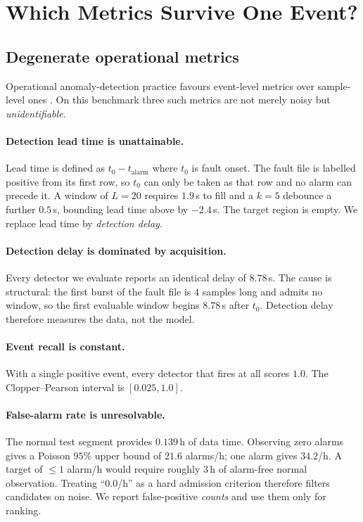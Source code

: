 \documentclass[twocolumn,10pt]{article}
\begin{document}
\section{Which Metrics Survive One Event?}
\label{sec:metrics}

\subsection{Degenerate operational metrics}

Operational anomaly-detection practice favours event-level metrics over
sample-level ones \citep{hundman2018detecting,garg2021evaluation}. On this
benchmark three such metrics are not merely noisy but \emph{unidentifiable}.

\paragraph{Detection lead time is unattainable.} Lead time is defined as
$t_0 - t_{\text{alarm}}$ where $t_0$ is fault onset. The fault file is labelled
positive from its first row, so $t_0$ can only be taken as that row and no
alarm can precede it. A window of $L=20$ requires $1.9$\,s to fill and a
$k=5$ debounce a further $0.5$\,s, bounding lead time above by $-2.4$\,s. The
target region is empty. We replace lead time by \emph{detection delay}.

\paragraph{Detection delay is dominated by acquisition.} Every detector we
evaluate reports an identical delay of $8.78$\,s. The cause is structural: the
first burst of the fault file is $4$ samples long and admits no window, so the
first evaluable window begins $8.78$\,s after $t_0$. Detection delay therefore
measures the data, not the model.

\paragraph{Event recall is constant.} With a single positive event, every
detector that fires at all scores $1.0$. The Clopper--Pearson interval is
$[0.025, 1.0]$.

\paragraph{False-alarm rate is unresolvable.} The normal test segment provides
$0.139$\,h of data time. Observing zero alarms gives a Poisson $95\%$ upper
bound of $21.6$ alarms/h; one alarm gives $34.2$/h. A target of
$\leq 1$ alarm/h would require roughly $3$\,h of alarm-free normal observation.
Treating ``$0.0$/h'' as a hard admission criterion therefore filters candidates
on noise. We report false-positive \emph{counts} and use them only for ranking.
\end{document}

